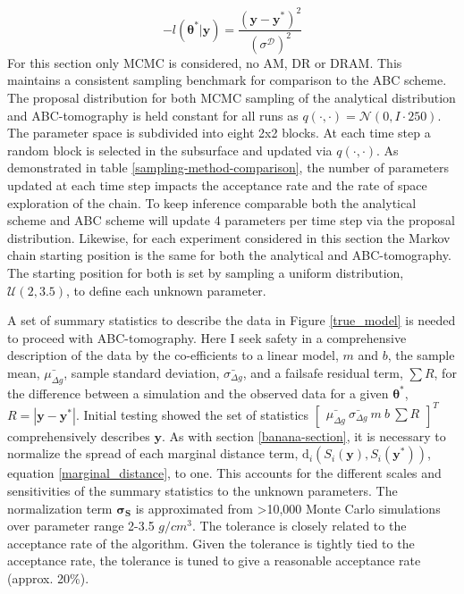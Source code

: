 \begin{equation}
	-l(\bm{\theta^*}|\bm{y}) = \frac{(\bm{y}-\bm{y^*})^2}{(\sigma^{\mathcal{D}})^2}
	\label{analytical-applied-likelihood}
\end{equation}
For this section only MCMC is considered, no AM, DR or DRAM. This maintains a consistent sampling benchmark for comparison to the ABC scheme. The proposal distribution for both MCMC sampling of the analytical distribution and ABC-tomography is held constant for all runs as $q(\cdot,\cdot) = \mathcal{N}(0,I\cdot250)$. The parameter space is subdivided into eight 2x2 blocks. At each time step a random block is selected in the subsurface and updated via $q(\cdot,\cdot)$. As demonstrated in table \ref{sampling-method-comparison}, the number of parameters updated at each time step impacts the acceptance rate and the rate of space exploration of the chain. To keep inference comparable both the analytical scheme and ABC scheme will update 4 parameters per time step via the proposal distribution. Likewise, for each experiment considered in this section the Markov chain starting position is the same for both the analytical and ABC-tomography. The starting position for both is set by sampling a uniform distribution, $\mathcal{U}(2,3.5)$, to define each unknown parameter. \par
A set of summary statistics to describe the data in Figure \ref{true_model} is needed to proceed with ABC-tomography. Here I seek safety in a comprehensive description of the data by the co-efficients to a linear model, $m$ and $b$, the sample mean, $\bar{\mu_{\Delta g}}$, sample standard deviation, $\bar{\sigma_{\Delta g}}$, and a failsafe residual term, $\sum R$, for the difference between a simulation and the observed data for a given $\bm{\theta^*}$, $R = |\bm{y}-\bm{y^*}|$. Initial testing showed the set of statistics $\begin{bmatrix}
\bar{\mu_{\Delta g}}\ \bar{\sigma_{\Delta g}}\ m\ b\ \sum R
\end{bmatrix}^T$ comprehensively describes $\bm{y}$. As with section \ref{banana-section}, it is necessary to normalize the spread of each marginal distance term, $\text{d}_i(S_i(\bm{y}),S_i(\bm{y^*}))$, equation \ref{marginal_distance}, to one. This accounts for the different scales and sensitivities of the summary statistics to the unknown parameters. The normalization term $\bm{\sigma_S}$ is approximated from >10,000 Monte Carlo simulations over parameter range 2-3.5 $g/cm^3$. The tolerance is closely related to the acceptance rate of the algorithm. Given the tolerance is tightly tied to the acceptance rate, the tolerance is tuned to give a reasonable acceptance rate (approx. 20\%).\par
